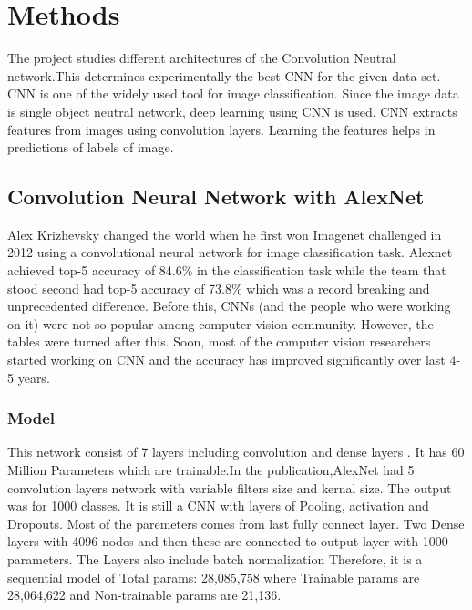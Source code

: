 \documentclass[10pt,twocolumn,letterpaper]{article}
\begin{document}
\section{Methods}

The project studies different architectures of the Convolution Neutral network.This determines experimentally the best CNN for the given data set. CNN is one of the widely used tool for image classification. Since the image data is single object neutral network, deep learning using CNN is used. CNN extracts features from images using convolution layers. Learning the features helps in predictions of labels of image.

\subsection{Convolution Neural Network with AlexNet}

Alex Krizhevsky changed the world when he first won Imagenet challenged in 2012 using a convolutional neural network for image classification task. Alexnet achieved top-5 accuracy of 84.6\% in the classification task while the team that stood second had top-5 accuracy of 73.8\% which was a record breaking and unprecedented difference. Before this, CNNs (and the people who were working on it) were not so popular among computer vision community. However, the tables were turned after this. Soon, most of the computer vision researchers started working on CNN and the accuracy has improved significantly over last 4-5 years.

\subsubsection{Model}
This network consist of 7 layers including convolution and dense layers \cite{alexnet}. It has 60 Million Parameters which are trainable.In the publication,AlexNet had 5 convolution layers network with variable filters size and kernal size. The output was for 1000 classes. It is still a CNN with layers of Pooling, activation and Dropouts. Most of the paremeters comes from last fully connect layer. Two Dense layers with 4096 nodes and then these are connected to output layer with 1000 parameters. The Layers also include batch normalization
Therefore, it is a sequential model of Total params: 28,085,758 where Trainable params are 28,064,622 and Non-trainable params are 21,136.
\end{document}
